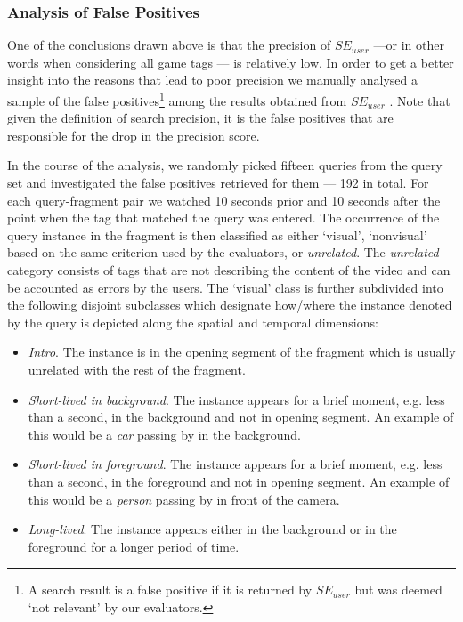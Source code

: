 \subsubsection{Analysis of False Positives}
One of the conclusions drawn above is that the precision of $SE_{user}$ ---or in other words when considering all game tags --- is relatively low. In order to get a better insight into the reasons that lead to poor precision we manually analysed a sample of the false positives\footnote{A search result is a false positive if it is returned by $SE_{user}$ but was deemed `not relevant' by our evaluators.} among the results obtained from $SE_{user}$ . Note that given the definition of search precision, it is the false positives that are responsible for the drop in the precision score.

In the course of the analysis, we randomly picked fifteen queries from the query set and investigated the false positives retrieved for them --- 192 in total. For each query-fragment pair we watched 10 seconds prior and 10 seconds after the point when the tag that matched the query was entered. The occurrence of the query instance in the fragment is then classified as either `visual', `nonvisual' based on the same criterion used by the evaluators, or \textit{unrelated}. The \textit{unrelated} category consists of tags that are not describing the content of the video and can be accounted as errors by the users. The `visual' class is further subdivided into the following disjoint subclasses which designate how/where the instance denoted by the query is depicted along the spatial and temporal dimensions:
\begin{itemize}
\item \textit{Intro}. The instance is in the opening segment of the fragment which is usually unrelated with the rest of the fragment.
\item \textit{Short-lived in background}. The instance appears for a brief moment, e.g. less than a second, in the background and not in opening segment. An example of this would be a \textit{car} passing by in the background.
\item \textit{Short-lived in foreground}. The instance appears for a brief moment, e.g. less than a second, in the foreground and not in opening segment. An example of this  would be a \textit{person} passing by in front of the camera.
\item \textit{Long-lived}. The instance appears either in the background or in the foreground for a longer period of time.
\end{itemize}
